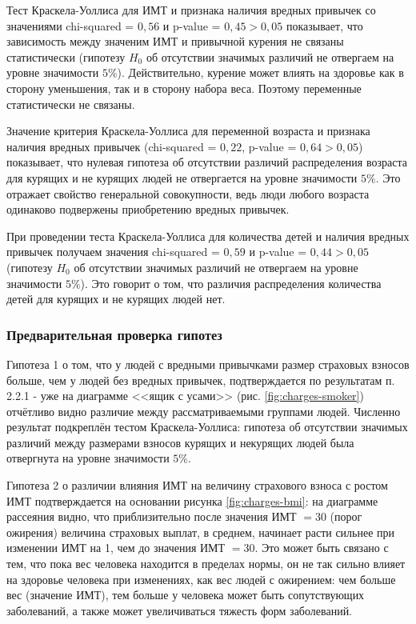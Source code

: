 \documentclass[a4paper,12pt]{article}
\begin{document}
Тест Краскела-Уоллиса для ИМТ и признака наличия вредных привычек со значениями chi-squared = $0,56$ и p-value = $0,45 > 0,05$ показывает, что зависимость между значеним ИМТ и привычной курения не связаны статистически (гипотезу $H_0$ об отсутствии значимых различий не отвергаем на уровне значимости $5\%$). Действительно, курение может влиять на здоровье как в сторону уменьшения, так и в сторону набора веса. Поэтому переменные статистически не связаны.

Значение критерия Краскела-Уоллиса для переменной возраста и признака наличия вредных привычек (chi-squared = $0,22$, p-value = $0,64 > 0,05$) показывает, что нулевая гипотеза об отсутствии различий распределения возраста для курящих и не курящих людей не отвергается на уровне значимости $5\%$. Это отражает свойство генеральной совокупности, ведь люди любого возраста одинаково подвержены приобретению вредных привычек.

При проведении теста Краскела-Уоллиса для количества детей и наличия вредных привычек получаем значения chi-squared = $0,59$ и p-value = $0,44 > 0,05$ (гипотезу $H_0$ об отсутствии значимых различий не отвергаем на уровне значимости $5\%$). Это говорит о том, что различия распределения количества детей для курящих и не курящих людей нет.

\subsubsection{Предварительная проверка гипотез}

Гипотеза 1 о том, что у людей с вредными привычками размер страховых взносов больше, чем у людей без вредных привычек, подтверждается по результатам п. 2.2.1 - уже на диаграмме <<ящик с усами>> (рис. \ref{fig:charges-smoker}) отчётливо видно различие между рассматриваемыми группами людей. Численно результат подкреплён тестом Краскела-Уоллиса: гипотеза об отсутствии значимых различий между размерами взносов курящих и некурящих людей была отвергнута на уровне значимости $5\%$.

Гипотеза 2 о различии влияния ИМТ на величину страхового взноса с ростом ИМТ подтверждается на основании рисунка \ref{fig:charges-bmi}: на диаграмме рассеяния видно, что приблизительно после значения ИМТ $= 30$ (порог ожирения) величина страховых выплат, в среднем, начинает расти сильнее при изменении ИМТ на 1, чем до значения ИМТ $= 30$. Это может быть связано с тем, что пока вес человека находится в пределах нормы, он не так сильно влияет на здоровье человека при изменениях, как вес людей с ожирением: чем больше вес (значение ИМТ), тем больше у человека может быть сопутствующих заболеваний, а также может увеличиваться тяжесть форм заболеваний.
\end{document}
